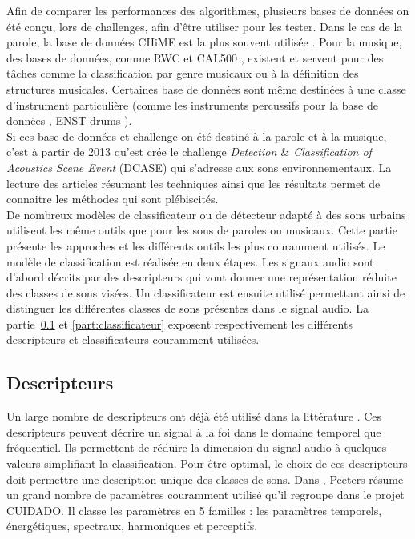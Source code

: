 Afin de comparer les performances des algorithmes, plusieurs bases de données on été conçu, lors de challenges, afin d'être utiliser pour les tester. Dans le cas de la parole, la base de données CHiME \cite{christensen_chime_2010} est la plus souvent utilisée \cite{barker_pascal_2013} \cite{araki_2011_2012}. Pour la musique, des bases de données, comme RWC \cite{goto_rwc_2003} et CAL500 \cite{wang_towards_2014}, existent et servent pour des tâches comme la classification par genre musicaux ou à la définition des structures musicales. Certaines base de données sont même destinées à une classe d'instrument particulière (comme les instruments percussifs pour la base de données , ENST-drums \cite{gillet_enst-drums:_2006}). \\

Si ces base de données et challenge on été destiné à la parole et à la musique, c'est à partir de 2013 qu'est crée le challenge \textit{Detection $\&$ Classification of Acoustics Scene Event} (DCASE) \cite{giannoulis_detection_2013} qui s'adresse aux sons environnementaux. La lecture des articles résumant les techniques ainsi que les résultats permet de connaitre les méthodes qui sont plébiscités. \\


De nombreux modèles de classificateur ou de détecteur adapté à des sons urbains utilisent les même outils que pour les sons de paroles ou musicaux. Cette partie présente les approches et les différents outils les plus couramment utilisés. Le modèle de classification est réalisée en deux étapes. Les signaux audio sont d'abord décrits par des descripteurs qui vont donner une représentation réduite des classes de sons visées. Un classificateur est ensuite utilisé permettant ainsi de distinguer les différentes classes de sons présentes dans le signal audio. La partie~\ref{part:descripteur} et \ref{part:classificateur} exposent respectivement les différents descripteurs et classificateurs couramment utilisées.

\subsection{Descripteurs}\label{part:descripteur}
Un large nombre de descripteurs ont déjà été utilisé dans la littérature \cite{} \cite{} \cite{}. Ces descripteurs peuvent décrire un signal à la foi dans le domaine temporel que fréquentiel. Ils permettent de réduire la dimension du signal audio à quelques valeurs simplifiant la classification. Pour être optimal, le choix de ces descripteurs doit permettre une description unique des classes de sons. Dans \cite{}, Peeters résume un grand nombre de paramètres couramment utilisé qu'il regroupe dans le projet CUIDADO. Il classe les paramètres en 5 familles : les paramètres temporels, énergétiques, spectraux, harmoniques et perceptifs.

